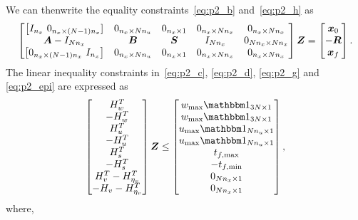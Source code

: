 \documentclass[12pt]{article}
\begin{document}
We can thenwrite the equality constraints~\eqref{eq:p2_b} and~\eqref{eq:p2_h} as
\begin{equation}
\begin{bmatrix}
\big[ I_{n_x} \ 0_{n_x \times (N-1)n_x}] & 0_{n_x \times N n_u} & 0_{n_x \times 1} & 0_{n_x \times N n_x} & 0_{n_x \times N n_x} \\
\bm{A} - I_{N n_x} & \bm{B} & \bm{S} & I_{N n_x} & 0_{N n_x \times N n_x} \\
\big[ 0_{n_x \times (N-1)n_x} \ I_{n_x} \big] & 0_{n_x \times N n_u} & 0_{n_x \times 1} & 0_{n_x \times Nn_x} & 0_{n_x \times N n_x}
\end{bmatrix} \bm{Z} = \begin{bmatrix}
\bm{x}_0 \\ -\bm{R} \\ \bm{x}_f
\end{bmatrix}.
\label{eq:std_equality}
\end{equation}
The linear inequality constraints in~\eqref{eq:p2_c}, \eqref{eq:p2_d}, \eqref{eq:p2_g} and \eqref{eq:p2_epi} are expressed as
\begin{equation}
\begin{bmatrix}
H_w^T \\ - H_w^T \\ H_u^T \\ - H_u^T \\ H_s^T \\ - H_s^T \\ H_v^T - H_{\eta_v}^T \\ -H_v - H_{\eta_v}^T
\end{bmatrix} \bm{Z} \leq \begin{bmatrix}
w_{\max} \ones{3N}{1} \\ w_{\max} \ones{3N}{1} \\ u_{\max} \ones{N n_u}{1} \\ u_{\max} \ones{N n_u}{1} \\ t_{f,\max} \\ -t_{f,\min} \\ \zeros{N n_x}{1} \\ \zeros{N n_x}{1}
\end{bmatrix},
\label{eq:std_ineq_lin}
\end{equation}
where,
\end{document}
